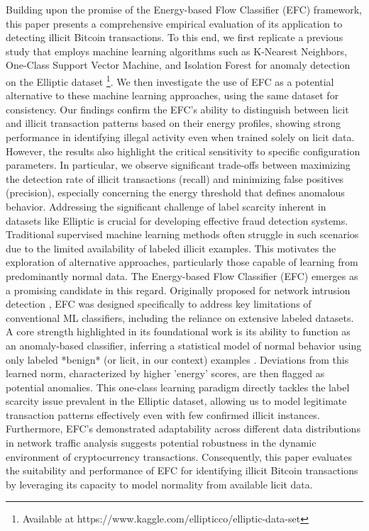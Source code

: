 \documentclass[12pt]{article}
\begin{document}
Building upon the promise of the Energy-based Flow Classifier (EFC) framework, this paper presents a comprehensive empirical
evaluation of its application to detecting illicit Bitcoin transactions. To this end, we first replicate a previous study
that employs machine learning algorithms such as K-Nearest Neighbors, One-Class Support Vector Machine, and Isolation Forest
for anomaly detection on the Elliptic dataset \footnote{Available at https://www.kaggle.com/ellipticco/elliptic-data-set}.
We then investigate the use of EFC as a potential alternative to these machine learning approaches, using the same dataset
for consistency. Our findings confirm the EFC's ability to distinguish between licit and illicit transaction patterns based
on their energy profiles, showing strong performance in identifying illegal activity even when trained solely on licit data.
However, the results also highlight the critical sensitivity to specific configuration parameters. In particular, we observe
significant trade-offs between maximizing the detection rate of illicit transactions (recall) and minimizing false positives
(precision), especially concerning the energy threshold that defines anomalous behavior. Addressing the significant challenge
of label scarcity inherent in datasets like Elliptic is crucial for developing effective fraud detection systems.
Traditional supervised machine learning methods often struggle in such scenarios due to the limited availability of
labeled illicit examples. This motivates the exploration of alternative approaches, particularly those capable of learning
from predominantly normal data. The Energy-based Flow Classifier (EFC) emerges as a promising candidate in this regard.
Originally proposed for network intrusion detection \cite{pontes2019, souza2022novelopensetenergybased}, EFC was designed
specifically to address key limitations of conventional ML classifiers, including the reliance on extensive labeled datasets.
A core strength highlighted in its foundational work is its ability to function as an anomaly-based classifier, inferring
a statistical model of normal behavior using only labeled *benign* (or licit, in our context) examples
\cite{souza2022novelopensetenergybased}. Deviations from this learned norm, characterized by higher 'energy' scores, are
then flagged as potential anomalies. This one-class learning paradigm directly tackles the label scarcity issue prevalent
in the Elliptic dataset, allowing us to model legitimate transaction patterns effectively even with few confirmed illicit
instances. Furthermore, EFC's demonstrated adaptability across different data distributions in network traffic analysis
suggests potential robustness in the dynamic environment of cryptocurrency transactions. Consequently, this paper evaluates
the suitability and performance of EFC for identifying illicit Bitcoin transactions by leveraging its capacity to model
normality from available licit data.
\end{document}
